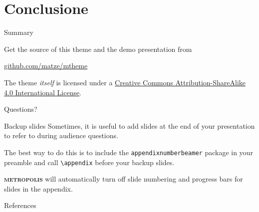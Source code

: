 \documentclass[10pt]{beamer}
\newcommand{\themename}{\textbf{\textsc{metropolis}}\xspace}
\begin{document}
\section{Conclusione}

\begin{frame}{Summary}

  Get the source of this theme and the demo presentation from

  \begin{center}\url{github.com/matze/mtheme}\end{center}

  The theme \emph{itself} is licensed under a
  \href{http://creativecommons.org/licenses/by-sa/4.0/}{Creative Commons
  Attribution-ShareAlike 4.0 International License}.

  \begin{center}\ccbysa\end{center}

\end{frame}

{
\begin{frame}[standout]
  Questions?
\end{frame}
}

\appendix

\begin{frame}[fragile]{Backup slides}
  Sometimes, it is useful to add slides at the end of your presentation to
  refer to during audience questions.

  The best way to do this is to include the \verb|appendixnumberbeamer|
  package in your preamble and call \verb|\appendix| before your backup slides.

  \themename will automatically turn off slide numbering and progress bars for
  slides in the appendix.
\end{frame}

\begin{frame}[allowframebreaks]{References}
  \printbibliography
\end{frame}
\end{document}
